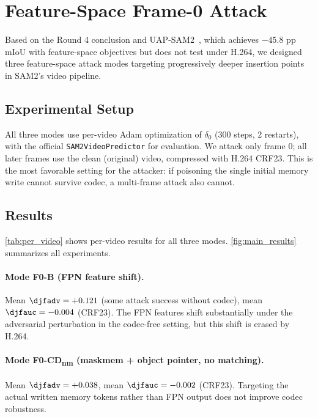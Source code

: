 \section{Feature-Space Frame-0 Attack}
\label{sec:feature_exps}

Based on the Round 4 conclusion and UAP-SAM2~\citep{uap_sam2_2025}, which achieves $-45.8$ pp mIoU with feature-space objectives but does not test under H.264, we designed three feature-space attack modes targeting progressively deeper insertion points in SAM2's video pipeline.

\subsection{Experimental Setup}

All three modes use per-video Adam optimization of $\delta_0$ (300 steps, 2 restarts), with the official \texttt{SAM2VideoPredictor} for evaluation. We attack only frame 0; all later frames use the clean (original) video, compressed with H.264 CRF23. This is the most favorable setting for the attacker: if poisoning the single initial memory write cannot survive codec, a multi-frame attack also cannot.

\subsection{Results}

\cref{tab:per_video} shows per-video results for all three modes. \cref{fig:main_results} summarizes all experiments.



\paragraph{Mode F0-B (FPN feature shift).}
Mean $\djfadv = +0.121$ (some attack success without codec), mean $\djfauc = -0.004$ (CRF23). The FPN features shift substantially under the adversarial perturbation in the codec-free setting, but this shift is erased by H.264.

\paragraph{Mode F0-CD\textsubscript{nm} (maskmem + object pointer, no matching).}
Mean $\djfadv = +0.038$, mean $\djfauc = -0.002$ (CRF23). Targeting the actual written memory tokens rather than FPN output does not improve codec robustness.

